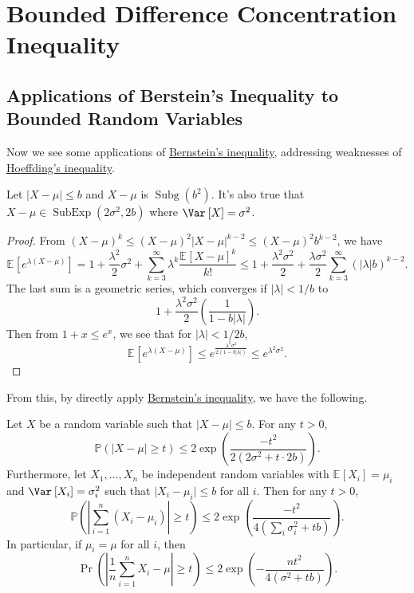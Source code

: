 \section{Bounded Difference Concentration Inequality}
\subsection{Applications of Berstein's Inequality to Bounded Random Variables}
Now we see some applications of \hyperref[thm:Bernstein-inequality]{Bernstein's inequality}, addressing weaknesses of \hyperref[thm:Hoeffding-inequality]{Hoeffding's inequality}.

\begin{lemma}\label{lma:Bernstein-inequality-for-bounded-random-variable}
	Let \(\vert X - \mu \vert \leq b\) and \(X - \mu \) is \(\mathop{\mathrm{Subg}}(b^2) \). It's also true that \(X - \mu \in \mathop{\mathrm{SubExp}}(2 \sigma ^{2} , 2b) \) where \(\Var_{}\left[X \right] = \sigma ^{2} \).
\end{lemma}
\begin{proof}
	From \((X - \mu )^k \leq (X - \mu )^2 \vert X - \mu \vert ^{k - 2} \leq (X - \mu )^2 b^{k-2}\), we have
	\[
		\mathbb{E}_{}\left[e^{\lambda (X - \mu )} \right]
		= 1 + \frac{\lambda ^{2} }{2} \sigma ^{2} + \sum_{k=3}^{\infty} \lambda ^k \frac{\mathbb{E}_{}\left[X - \mu  \right] ^k}{k!}
		\leq 1 + \frac{\lambda ^2 \sigma ^2}{2} + \frac{\lambda \sigma ^2}{2} \sum_{k=3}^{\infty} (\vert \lambda  \vert b)^{k - 2}.
	\]
	The last sum is a geometric series, which converges if \(\vert \lambda  \vert < 1 / b\) to
	\[
		1 + \frac{\lambda ^2 \sigma ^2}{2} \left( \frac{1}{1 - b \vert \lambda \vert } \right) .
	\]
	Then from \(1 + x \leq e^x\), we see that for \(\vert \lambda \vert < 1/2b\),
	\[
		\mathbb{E}_{}\left[e^{\lambda (X - \mu )} \right]
		\leq e^{\frac{\lambda ^2 \sigma ^{2} }{2(1 - b \vert \lambda \vert )}}
		\leq e^{\lambda ^{2} \sigma ^{2} }.
	\]
\end{proof}

From this, by directly apply \hyperref[thm:Bernstein-inequality]{Bernstein's inequality}, we have the following.

\begin{corollary}\label{col:Bernstein-inequality-for-bounded-random-variable*}
	Let \(X\) be a random variable such that \(\vert X - \mu \vert \leq b\). For any \(t > 0\),
	\[
		\mathbb{P} (\vert X - \mu  \vert \geq t) \leq 2 \exp \left( \frac{- t^2}{2(2\sigma ^{2} + t\cdot 2b)} \right).
	\]
	Furthermore, let \(X_1, \dots , X_n\) be independent random variables with \(\mathbb{E}_{}\left[X_i \right] = \mu _i\) and \(\Var_{}\left[X_i \right] = \sigma _i^{2}\) such that \(\vert X_i - \mu _i \vert \leq b\) for all \(i\). Then for any \(t > 0\),
	\[
		\mathbb{P} \left( \left\vert \sum_{i=1}^n (X_i - \mu _i) \right\vert \geq t \right) \leq 2 \exp \left( \frac{-t^2}{4\left( \sum_{i} \sigma _i^2 + tb\right) } \right).
	\]
	In particular, if \(\mu _i = \mu \) for all \(i\), then
	\[
		\Pr_{}\left( \left\vert \frac{1}{n} \sum_{i=1}^{n} X_i - \mu \right\vert \geq t \right)  \leq 2 \exp \left( - \frac{nt^2}{4(\sigma ^{2} + tb)} \right) .
	\]
\end{corollary}

